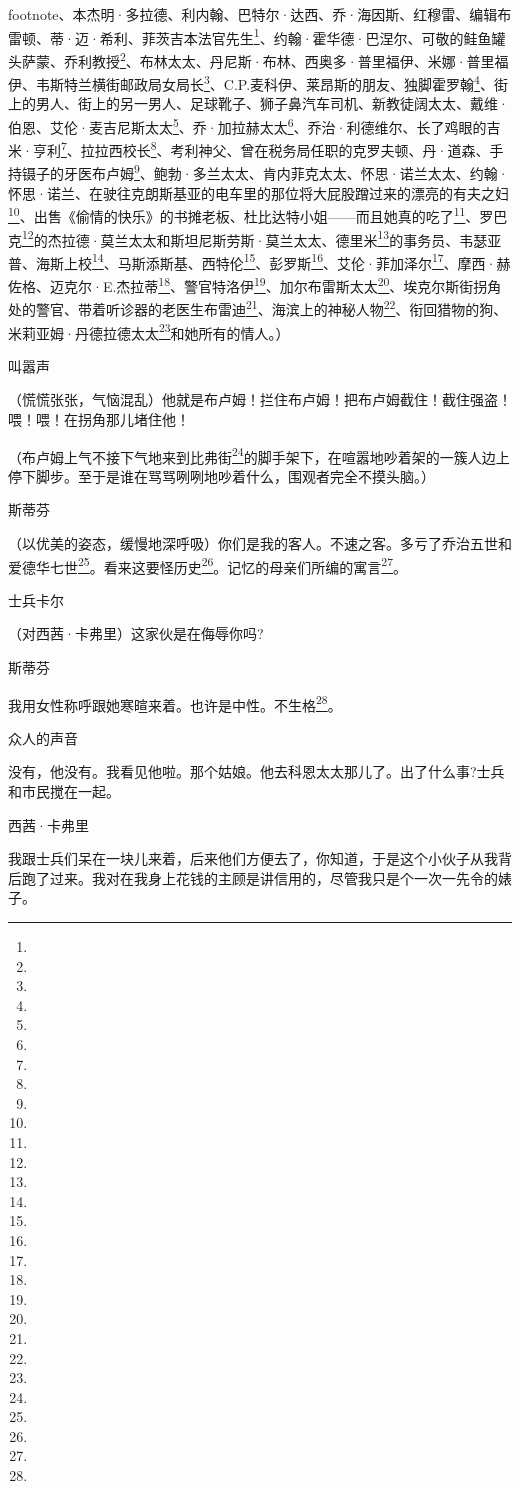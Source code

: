 footnote{}、本杰明·多拉德、利内翰、巴特尔·达西、乔·海因斯、红穆雷、编辑布雷顿、蒂·迈·希利、菲茨吉本法官先生\footnote{}、约翰·霍华德·巴涅尔、可敬的鲑鱼罐头萨蒙、乔利教授\footnote{}、布林太太、丹尼斯·布林、西奥多·普里福伊、米娜·普里福伊、韦斯特兰横街邮政局女局长\footnote{}、C.P.麦科伊、莱昂斯的朋友、独脚霍罗翰\footnote{}、街上的男人、街上的另一男人、足球靴子、狮子鼻汽车司机、新教徒阔太太、戴维·伯恩、艾伦·麦吉尼斯太太\footnote{}、乔·加拉赫太太\footnote{}、乔治·利德维尔、长了鸡眼的吉米·亨利\footnote{}、拉拉西校长\footnote{}、考利神父、曾在税务局任职的克罗夫顿、丹·道森、手持镊子的牙医布卢姆\footnote{}、鲍勃·多兰太太、肯内菲克太太、怀思·诺兰太太、约翰·怀思·诺兰、在驶往克朗斯基亚的电车里的那位将大屁股蹭过来的漂亮的有夫之妇\footnote{}、出售《偷情的快乐》的书摊老板、杜比达特小姐——而且她真的吃了\footnote{}、罗巴克\footnote{}的杰拉德·莫兰太太和斯坦尼斯劳斯·莫兰太太、德里米\footnote{}的事务员、韦瑟亚普、海斯上校\footnote{}、马斯添斯基、西特伦\footnote{}、彭罗斯\footnote{}、艾伦·菲加泽尔\footnote{}、摩西·赫佐格、迈克尔·E.杰拉蒂\footnote{}、警官特洛伊\footnote{}、加尔布雷斯太太\footnote{}、埃克尔斯街拐角处的警官、带着听诊器的老医生布雷迪\footnote{}、海滨上的神秘人物\footnote{}、衔回猎物的狗、米莉亚姆·丹德拉德太太\footnote{}和她所有的情人。）
\par 叫嚣声
\par （慌慌张张，气恼混乱）他就是布卢姆！拦住布卢姆！把布卢姆截住！截住强盗！喂！喂！在拐角那儿堵住他！
\par （布卢姆上气不接下气地来到比弗街\footnote{}的脚手架下，在喧嚣地吵着架的一簇人边上停下脚步。至于是谁在骂骂咧咧地吵着什么，围观者完全不摸头脑。）
\par 斯蒂芬
\par （以优美的姿态，缓慢地深呼吸）你们是我的客人。不速之客。多亏了乔治五世和爱德华七世\footnote{}。看来这要怪历史\footnote{}。记忆的母亲们所编的寓言\footnote{}。
\par 士兵卡尔
\par （对西茜·卡弗里）这家伙是在侮辱你吗?
\par 斯蒂芬
\par 我用女性称呼跟她寒暄来着。也许是中性。不生格\footnote{}。
\par 众人的声音
\par 没有，他没有。我看见他啦。那个姑娘。他去科恩太太那儿了。出了什么事?士兵和市民搅在一起。
\par 西茜·卡弗里
\par 我跟士兵们呆在一块儿来着，后来他们方便去了，你知道，于是这个小伙子从我背后跑了过来。我对在我身上花钱的主顾是讲信用的，尽管我只是个一次一先令的婊子。
